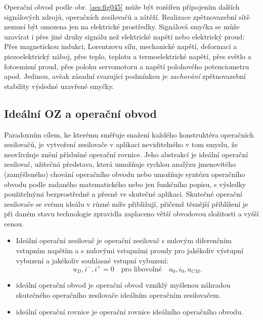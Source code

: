       Operační obvod podle obr. \ref{aes:fig045} může být rozšířen připojením dalších signálových
      zdrojů, operačních zesilovačů a zátěží. Realizace zpětnovazební sítě nemusí být omezena jen na
      elektrické prostředky. Signálová smyčka se může uzavírat i přes jiné druhy signálu než
      elektrické napětí nebo elektrický proud: Přes magnetickou indukci, Lorentzovu sílu, mechanické
      napětí, deformaci a piezoelektrický náboj, přes teplo, teplotu a termoelektrické napětí, přes
      světlo a fotoemisní proud, přes polohu servomotoru a napětí polohového potenciometru apod.
      Jedinou, avšak zásadní svazující podmínkou je \emph{zachování} zpětnovazební stability
      výsledné uzavřené smyčky.


    \subsection{Ideální OZ a operační obvod}\label{aesIchIIIsecIssecIII}
      Paradoxním cílem, ke kterému směřuje snažení každého konstruktéra operačních zesilovačů, je
      vytvoření zesilovače v aplikaci neviditelného v tom smyslu, že neovlivňuje znění příslušné
      operační rovnice. Jeho abstrakcí je ideální operační zesilovač, užitečná představa, která
      umožňuje rychlou analýzu jmenovitého (zamýšleného) chování operačního obvodu nebo umožňuje
      syntézu operačního obvodu podle zadaného matematického nebo jen funkčního popisu, s výsledky
      použitelnými bezprostředně a přesně ve skutečné aplikaci. Skutečné operační zesilovače se
      svému ideálu v různé míře přibližují, přičemž těsnější přiblížení je při daném stavu
      technologie zpravidla zaplaceno větší obvodovou složitosti a vyšší cenou.
      \begin{itemize}[noitemsep]
        \item Ideální operační zesilovač je operační zesilovač s nulovým diferenčním vstupním
              napětím a s nulovými vstupními proudy pro jakékoliv výstupní vybuzení a jakékoliv
              souhlasné vstupní vybuzení: 
              \begin{equation}\label{aes:eq029}
                u_D, i^-, i^+ = 0 \quad\text{pro libovolné}\quad u_0, i_0, u_{CM}.
              \end{equation}
        \item ideální operační obvod je operační obvod vzniklý myšlenou náhradou skutečného
              operačního zesilovače ideálním operačním zesilovačem.     
        \item ideální operační rovnice je operační rovnice ideálního operačního obvodu.
      \end{itemize}

